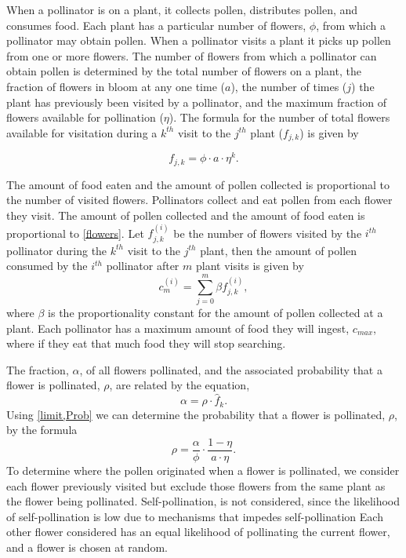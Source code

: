 When a pollinator is on a plant, it collects pollen, distributes pollen, and
consumes food. Each plant has a particular number of flowers, $\phi$, from which
a pollinator may obtain pollen. When a pollinator visits a plant it picks up
pollen from one or more flowers. The number of flowers from which a pollinator
can obtain pollen is determined by the total number of flowers on a plant, the
fraction of flowers in bloom at any one time ($a$), the number of times ($j$)
the plant has previously been visited by a pollinator, and the maximum fraction
of flowers available for pollination ($\eta$). The formula for the number of
total flowers available for visitation during a $k^{th}$ visit to the $j^{th}$
plant ($f_{j,k}$) is given by

\begin{equation}\label{flowers}
f_{j,k} = \phi \cdot a \cdot \eta^k.
\end{equation}

The amount of food eaten and the amount of pollen collected is proportional to
the number of visited flowers. Pollinators collect and eat pollen from each
flower they visit.  The amount of pollen collected and the amount of food eaten
is proportional to \cref{flowers}. Let $f^{\left(i\right)}_{j,k}$
be the number of flowers visited by the $i^{th}$ pollinator during the $k^{th}$
visit to the $j^{th}$ plant, then the amount of pollen consumed by the $i^{th}$
pollinator after $m$ plant visits is given by
\begin{equation}
  c^{\left(i\right)}_m = \sum_{j=0}^{m} \beta f^{\left(i\right)}_{j,k},
  \label{limit}
\end{equation}
where $\beta$ is the proportionality constant for
the amount of pollen collected at a plant.  Each pollinator has a maximum amount
of food they will ingest, $c_{max}$, where if they eat that much food they will
stop searching.

The fraction, $\alpha$, of all flowers pollinated, and the associated
probability that a flower is pollinated, $\rho$, are related by the equation,
\begin{equation} \label{Prob}
  \alpha = \rho \cdot \hat{f}_k.
\end{equation}
Using \cref{limit,Prob} we can determine the probability
that a flower is pollinated, $\rho$, by the formula
\begin{equation*}
  \rho = \frac{\alpha}{\phi} \cdot \frac{1 - \eta}{a \cdot \eta}.
\end{equation*}
To determine where the pollen originated when a flower is pollinated, we
consider each flower previously visited but exclude those flowers from the same
plant as the flower being pollinated.    Self-pollination, is not considered,
since the likelihood of self-pollination is low due to mechanisms that impedes
self-pollination%
Each other flower
considered has an equal likelihood of pollinating the current flower, and a
flower is chosen at random.

